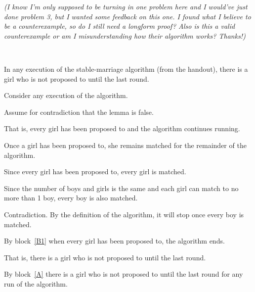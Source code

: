 \documentclass[11pt]{article}
\begin{document}
\begin{problems}
  \textit{(I know I'm only supposed to be turning in one problem here and I would've just done problem 3, but I wanted some 
  feedback on this one. I found what I believe to be a counterexample, so do I still need a longform proof? Also is this a 
  valid counterexample or am I misunderstanding how their algorithm works? Thanks!)}

  \lineacross


~

  \lineacross 

  \begin{lemma}
    In any execution of the stable-marriage algorithm (from the handout),
    there is a girl who is not proposed to until the last round.
  \end{lemma}

  \begin{longFormProof}

    \begin{block}[A]
      {Consider any execution of the algorithm.}

      \begin{block}[B1]    %
        {Assume for contradiction that the lemma is false.}

        \step That is, every girl has been proposed to and the algorithm continues running.

        \step Once a girl has been proposed to, she remains matched for the remainder of the algorithm.

        \step Since every girl has been proposed to, every girl is matched.

        \step Since the number of boys and girls is the same and each girl can match to no more than 1 boy, every boy is also matched.

        \step Contradiction. By the definition of the algorithm, it will stop once every boy is matched.

      \end{block}

      \step By block~\ref{B1} when every girl has been proposed to, the algorithm ends.

      \step That is, there is a girl who is not proposed to until the last round.
    \end{block}

    \step By block~\ref{A} there is a girl who is not proposed to until the last round for any run of the algorithm.


\end{longFormProof}
\end{problems}
\end{document}
